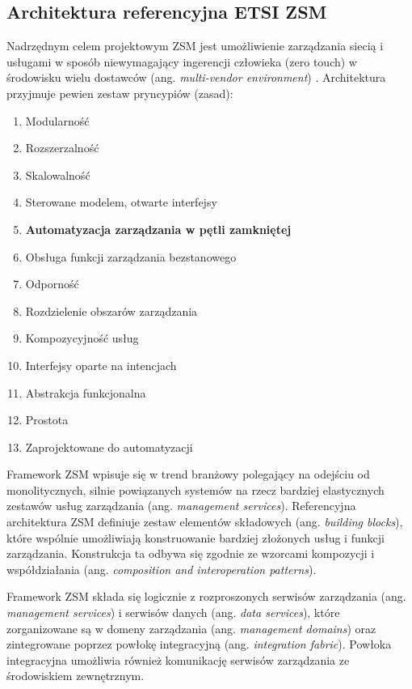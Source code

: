 \subsection{Architektura referencyjna ETSI ZSM}\hypertarget{sec:zsm}{}
Nadrzędnym celem projektowym ZSM jest umożliwienie zarządzania siecią i usługami w sposób niewymagający ingerencji człowieka (zero touch) w środowisku wielu dostawców (ang. \textit{multi-vendor environment}) \cite{etsizsm2018}. Architektura przyjmuje pewien zestaw pryncypiów (zasad):
\begin{enumerate}\hypertarget{list:2}{}
    \item Modularność  
    \item Rozszerzalność  
    \item Skalowalność  
    \item Sterowane modelem, otwarte interfejsy  
    \item \textbf{Automatyzacja zarządzania w pętli zamkniętej}  
    \item Obsługa funkcji zarządzania bezstanowego  
    \item Odporność  
    \item Rozdzielenie obszarów zarządzania  
    \item Kompozycyjność usług  
    \item Interfejsy oparte na intencjach  
    \item Abstrakcja funkcjonalna  
    \item Prostota  
    \item Zaprojektowane do automatyzacji  
\end{enumerate}

Framework ZSM wpisuje się w trend branżowy polegający na odejściu od monolitycznych, silnie powiązanych systemów na rzecz bardziej elastycznych zestawów usług zarządzania (ang. \textit{management services}). Referencyjna architektura ZSM definiuje zestaw elementów składowych (ang. \textit{building blocks}), które wspólnie umożliwiają konstruowanie bardziej złożonych usług i funkcji zarządzania. Konstrukcja ta odbywa się zgodnie ze wzorcami kompozycji i współdziałania (ang. \textit{composition and interoperation patterns}). 

Framework ZSM składa się logicznie z rozproszonych serwisów zarządzania (ang. \textit{management services}) i serwisów danych (ang. \textit{data services}), które zorganizowane są w domeny zarządzania (ang. \textit{management domains}) oraz zintegrowane poprzez powłokę integracyjną (ang. \textit{integration fabric}). Powłoka integracyjna umożliwia również komunikację serwisów zarządzania ze środowiskiem zewnętrznym.

